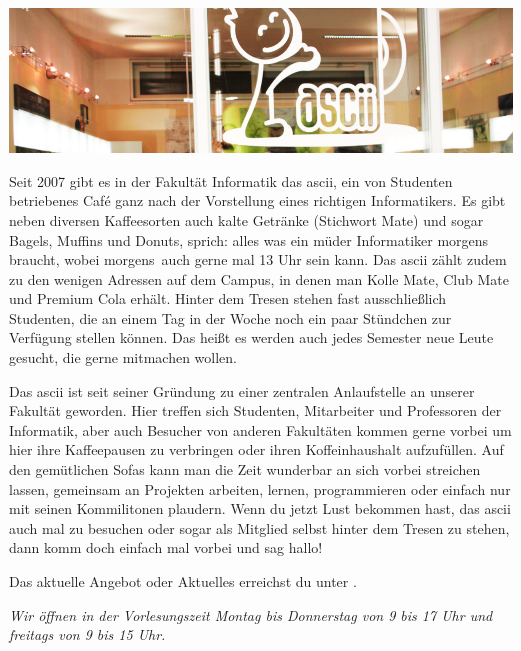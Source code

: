 
\includegraphics[width=\linewidth]{img/ascii.jpg}

Seit 2007 gibt es in der Fakultät Informatik das ascii, ein von Studenten betriebenes Café ganz nach der Vorstellung eines richtigen Informatikers.
Es gibt neben diversen Kaffeesorten auch kalte Getränke (Stichwort Mate) und sogar Bagels, Muffins und Donuts, sprich:
alles was ein müder Informatiker morgens braucht, wobei \glqq morgens\grqq\ auch gerne mal 13 Uhr sein kann.
Das ascii zählt zudem zu den wenigen Adressen auf dem Campus, in denen man Kolle Mate, Club Mate und Premium Cola erhält.
Hinter dem Tresen stehen fast ausschließlich Studenten, die an einem Tag in der Woche noch ein paar Stündchen zur Verfügung stellen können.
Das heißt es werden auch jedes Semester neue Leute gesucht, die gerne mitmachen wollen.

Das ascii ist seit seiner Gründung zu einer zentralen Anlaufstelle an unserer Fakultät geworden.
Hier treffen sich Studenten, Mitarbeiter und Professoren der Informatik, aber auch Besucher von anderen Fakultäten kommen gerne vorbei um hier ihre Kaffeepausen zu verbringen oder ihren Koffeinhaushalt aufzufüllen.
Auf den gemütlichen Sofas kann man die Zeit wunderbar an sich vorbei streichen lassen, gemeinsam an Projekten arbeiten, lernen, programmieren oder einfach nur mit seinen Kommilitonen plaudern.
Wenn du jetzt Lust bekommen hast, das ascii auch mal zu besuchen oder sogar als Mitglied selbst hinter dem Tresen zu stehen, dann komm doch einfach mal vorbei und sag hallo!

Das aktuelle Angebot oder Aktuelles erreichst du unter .

\textit{Wir öffnen in der Vorlesungszeit Montag bis Donnerstag von 9 bis 17 Uhr und freitags von 9 bis 15 Uhr.}
